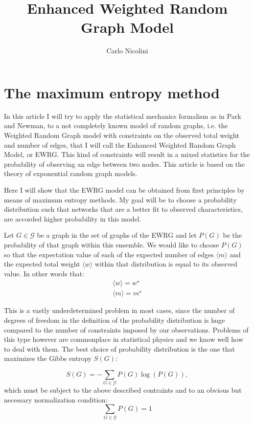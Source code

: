 \documentclass[a4paper]{article}
\begin{document}
\title{Enhanced Weighted Random Graph Model}
\author{Carlo Nicolini}

\maketitle
\section{The maximum entropy method}

In this article I will try to apply the statistical mechanics formalism as in Park and Newman, to a not completely known model of random graphs, i.e. the Weighted Random Graph model with  constraints on the observed total weight and number of edges, that I will call the Enhanced Weighted Random Graph Model, or EWRG.
This kind of constraints will result in a mixed statistics for the probability of observing an edge between two nodes.
This article is based on the theory of exponential random graph
models.

Here I will show that the EWRG model can be obtained from first principles by means of maximum entropy methods. My goal will be to choose a probability distribution such that networks that are a better fit to observed characteristics, are accorded higher probability in this model.

Let $G \in \mathcal{G}$ be a graph in the set of graphs of the EWRG and let $P(G)$ be the probability of that graph within this ensemble.
We would like to choose $P(G)$ so that the expectation value of each of the expected number of edges $\langle m \rangle$ and the expected total weight $\langle w \rangle$ within that distribution is equal to its observed value. In other words that:
\begin{align}
\langle w \rangle = w^{\star} \nonumber \\
\langle m \rangle = m^{\star}
\end{align}

This is a vastly underdetermined problem in most cases, since the number of degrees of freedom in the definition of the probability distribution is huge compared to the number of constraints imposed by our observations.
Problems of this type however are commonplace in statistical physics and we know well how to deal with them. The best choice of probability distribution is the one that maximizes the Gibbs entropy $S(G)$:

\begin{equation}
S(G) = - \sum \limits_{G \in \mathcal{G}} P(G)\log\left( P(G) \right ),
\end{equation}
which must be subject to the above described contraints and to an
obvious but necessary normalization condition:
\begin{equation}
\sum \limits_{G \in \mathcal{G}} P(G) = 1
\end{equation}
\end{document}
